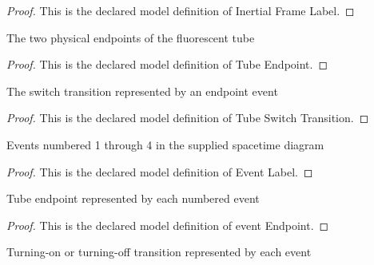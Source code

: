 \begin{proof}
  This is the declared model definition of Inertial Frame Label.
\end{proof}
\begin{definition}
  \label{def:physics:phyx-mini-0610:phyxminiproblems-problemphyxmini0610-tubeendpoint}
  The two physical endpoints of the fluorescent tube
\end{definition}
\begin{proof}
  This is the declared model definition of Tube Endpoint.
\end{proof}
\begin{definition}
  \label{def:physics:phyx-mini-0610:phyxminiproblems-problemphyxmini0610-tubeswitchtransition}
  The switch transition represented by an endpoint event
\end{definition}
\begin{proof}
  This is the declared model definition of Tube Switch Transition.
\end{proof}
\begin{definition}
  \label{def:physics:phyx-mini-0610:phyxminiproblems-problemphyxmini0610-eventlabel}
  Events numbered 1 through 4 in the supplied spacetime diagram
\end{definition}
\begin{proof}
  This is the declared model definition of Event Label.
\end{proof}
\begin{definition}
  \label{def:physics:phyx-mini-0610:phyxminiproblems-problemphyxmini0610-eventendpoint}
  Tube endpoint represented by each numbered event
\end{definition}
\begin{proof}
  This is the declared model definition of event Endpoint.
\end{proof}
\begin{definition}
  \label{def:physics:phyx-mini-0610:phyxminiproblems-problemphyxmini0610-eventswitchtransition}
  Turning-on or turning-off transition represented by each event
\end{definition}
